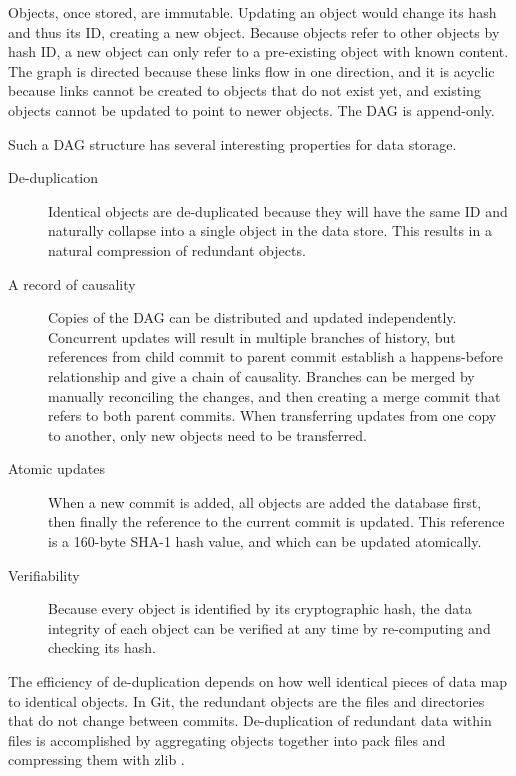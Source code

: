 \documentclass[
    usenglish,
]{nik}
\begin{document}
Objects, once stored, are immutable.
Updating an object would change its hash and thus its ID, creating a new object.
Because objects refer to other objects by hash ID, a new object can only refer to a pre-existing object with known content.
The graph is directed because these links flow in one direction, and it is acyclic because links cannot be created to objects that do not exist yet, and existing objects cannot be updated to point to newer objects.
The DAG is append-only.

Such a DAG structure has several interesting properties for data storage.
\begin{description}
    \item[De-duplication]
        Identical objects are de-duplicated because they will have the same ID and naturally collapse into a single object in the data store.
        This results in a natural compression of redundant objects.
    \item[A record of causality]
        Copies of the DAG can be distributed and updated independently.
        Concurrent updates will result in multiple branches of history, but references from child commit to parent commit establish a happens-before relationship and give a chain of causality.
        Branches can be merged by manually reconciling the changes, and then creating a merge commit that refers to both parent commits.
        When transferring updates from one copy to another, only new objects need to be transferred.
    \item[Atomic updates]
        When a new commit is added, all objects are added the database first, then finally the reference to the current commit is updated.
        This reference is a 160-byte SHA-1 hash value, and which can be updated atomically.
    \item[Verifiability]
        Because every object is identified by its cryptographic hash, the data integrity of each object can be verified at any time by re-computing and checking its hash.
\end{description}


The efficiency of de-duplication depends on how well identical pieces of data map to identical objects.
In Git, the redundant objects are the files and directories that do not change between commits.
De-duplication of redundant data within files is accomplished by aggregating objects together into pack files and compressing them with zlib \cite[Section 1.4]{git_book}.
\end{document}
